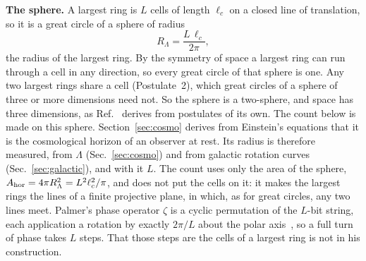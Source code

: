 \documentclass[aps,prd,twocolumn,superscriptaddress,nofootinbib,showkeys]{revtex4-2}
\newcommand{\lc}{\ell_c}
\newcommand{\RL}{R_\Lambda}
\begin{document}
\textbf{The sphere.} A largest ring is $L$ cells of length $\lc$ on a closed line of translation, so it is a great circle of a sphere of radius
\begin{equation}
\RL = \frac{L\,\lc}{2\pi} ,
\label{eq:ident}
\end{equation}
the radius of the largest ring. By the symmetry of space a largest ring can run through a cell in any direction, so every great circle of that sphere is one. Any two largest rings share a cell (Postulate~2), which great circles of a sphere of three or more dimensions need not. So the sphere is a two-sphere, and space has three dimensions, as Ref.~\cite{korytko2026d} derives from postulates of its own. The count below is made on this sphere. Section~\ref{sec:cosmo} derives from Einstein's equations that it is the cosmological horizon of an observer at rest. Its radius is therefore measured, from $\Lambda$ (Sec.~\ref{sec:cosmo}) and from galactic rotation curves (Sec.~\ref{sec:galactic}), and with it $L$. The count uses only the area of the sphere, $A_{\rm hor} = 4\pi\RL^2 = L^2\lc^2/\pi$, and does not put the cells on it: it makes the largest rings the lines of a finite projective plane, in which, as for great circles, any two lines meet. Palmer's phase operator $\zeta$ is a cyclic permutation of the $L$-bit string, each application a rotation by exactly $2\pi/L$ about the polar axis~\cite{palmer2026}, so a full turn of phase takes $L$ steps. That those steps are the cells of a largest ring is not in his construction.
\end{document}
